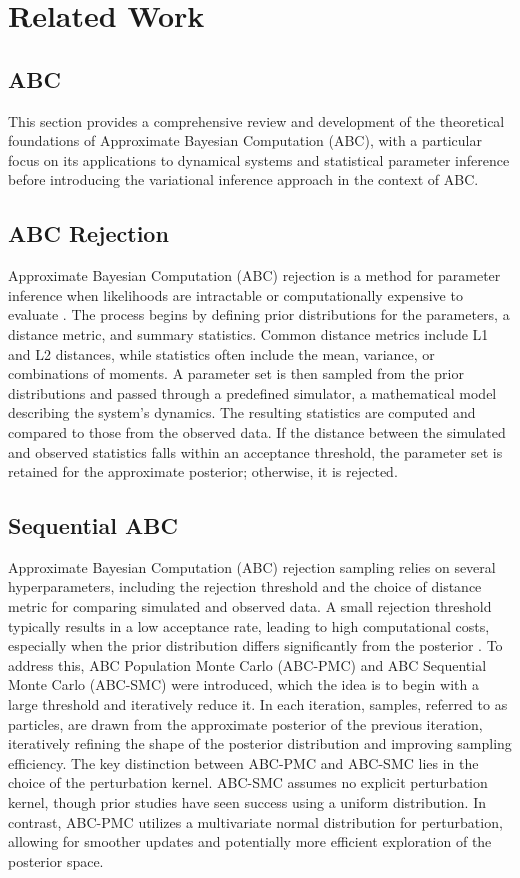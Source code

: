 \documentclass[12pt]{article} %
\begin{document}
\section{Related Work}

\subsection{ABC}
This section provides a comprehensive review and development of the theoretical foundations of Approximate Bayesian Computation (ABC), with a particular focus on its applications to dynamical systems and statistical parameter inference before introducing the variational inference approach in the context of ABC. 

\subsection*{ABC Rejection}
Approximate Bayesian Computation (ABC) rejection is a method for parameter inference when likelihoods are intractable or computationally expensive to evaluate \citep{tavare1997inferring}. The process begins by defining prior distributions for the parameters, a distance metric, and summary statistics. Common distance metrics include L1 and L2 distances, while statistics often include the mean, variance, or combinations of moments. A parameter set is then sampled from the prior distributions and passed through a predefined simulator, a mathematical model describing the system's dynamics. The resulting statistics are computed and compared to those from the observed data. If the distance between the simulated and observed statistics falls within an acceptance threshold, the parameter set is retained for the approximate posterior; otherwise, it is rejected.

\subsection*{Sequential ABC}
Approximate Bayesian Computation (ABC) rejection sampling relies on several hyperparameters, including the rejection threshold and the choice of distance metric for comparing simulated and observed data. A small rejection threshold typically results in a low acceptance rate, leading to high computational costs, especially when the prior distribution differs significantly from the posterior \citep{toni2009approximate}. To address this, ABC Population Monte Carlo (ABC-PMC) and ABC Sequential Monte Carlo (ABC-SMC) were introduced, which the idea is to begin with a large threshold and iteratively reduce it. In each iteration, samples, referred to as particles, are drawn from the approximate posterior of the previous iteration, iteratively refining the shape of the posterior distribution and improving sampling efficiency. The key distinction between ABC-PMC and ABC-SMC lies in the choice of the perturbation kernel. ABC-SMC assumes no explicit perturbation kernel, though prior studies have seen success using a uniform distribution. In contrast, ABC-PMC utilizes a multivariate normal distribution for perturbation, allowing for smoother updates and potentially more efficient exploration of the posterior space.
\end{document}

